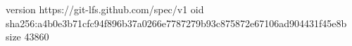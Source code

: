 version https://git-lfs.github.com/spec/v1
oid sha256:a4b0e3b71cfc94f896b37a0266e7787279b93c875872e67106ad904431f45e8b
size 43860
